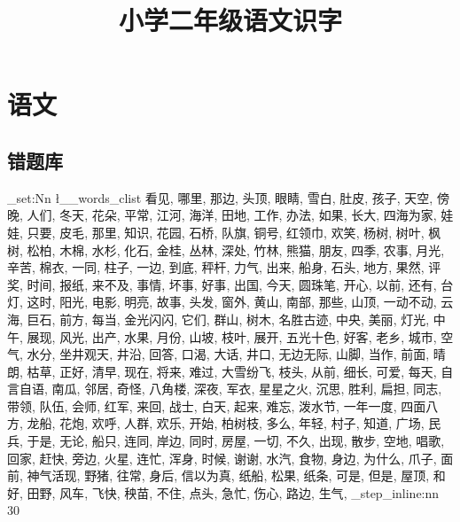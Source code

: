 \documentclass[scheme=chinese,a4paper,12pt]{ctexart}
\title{小学二年级语文识字}
\begin{document}
\maketitle
\section{语文}
\subsection{错题库}
\setlength{\parindent}{0pt}

\ExplSyntaxOn
\clist_set:Nn \l__words_clist
{
{看见},
{哪里},
{那边},
{头顶},
{眼睛},
{雪白},
{肚皮},
{孩子},
{天空},
{傍晚},
{人们},
{冬天},
{花朵},
{平常},
{江河},
{海洋},
{田地},
{工作},
{办法},
{如果},
{长大},
{四海为家},
{娃娃},
{只要},
{皮毛},
{那里},
{知识},
{花园},
{石桥},
{队旗},
{铜号},
{红领巾},
{欢笑},
{杨树},
{树叶},
{枫树},
{松柏},
{木棉},
{水杉},
{化石},
{金桂},
{丛林},
{深处},
{竹林},
{熊猫},
{朋友},
{四季},
{农事},
{月光},
{辛苦},
{棉衣},
{一同},
{柱子},
{一边},
{到底},
{秤杆},
{力气},
{出来},
{船身},
{石头},
{地方},
{果然},
{评奖},
{时间},
{报纸},
{来不及},
{事情},
{坏事},
{好事},
{出国},
{今天},
{圆珠笔},
{开心},
{以前},
{还有},
{台灯},
{这时},
{阳光},
{电影},
{明亮},
{故事},
{头发},
{窗外},
{黄山},
{南部},
{那些},
{山顶},
{一动不动},
{云海},
{巨石},
{前方},
{每当},
{金光闪闪},
{它们},
{群山},
{树木},
{名胜古迹},
{中央},
{美丽},
{灯光},
{中午},
{展现},
{风光},
{出产},
{水果},
{月份},
{山坡},
{枝叶},
{展开},
{五光十色},
{好客},
{老乡},
{城市},
{空气},
{水分},
{坐井观天},
{井沿},
{回答},
{口渴},
{大话},
{井口},
{无边无际},
{山脚},
{当作},
{前面},
{晴朗},
{枯草},
{正好},
{清早},
{现在},
{将来},
{难过},
{大雪纷飞},
{枝头},
{从前},
{细长},
{可爱},
{每天},
{自言自语},
{南瓜},
{邻居},
{奇怪},
{八角楼},
{深夜},
{军衣},
{星星之火},
{沉思},
{胜利},
{扁担},
{同志},
{带领},
{队伍},
{会师},
{红军},
{来回},
{战士},
{白天},
{起来},
{难忘},
{泼水节},
{一年一度},
{四面八方},
{龙船},
{花炮},
{欢呼},
{人群},
{欢乐},
{开始},
{柏树枝},
{多么},
{年轻},
{村子},
{知道},
{广场},
{民兵},
{于是},
{无论},
{船只},
{连同},
{岸边},
{同时},
{房屋},
{一切},
{不久},
{出现},
{散步},
{空地},
{唱歌},
{回家},
{赶快},
{旁边},
{火星},
{连忙},
{浑身},
{时候},
{谢谢},
{水汽},
{食物},
{身边},
{为什么},
{爪子},
{面前},
{神气活现},
{野猪},
{往常},
{身后},
{信以为真},
{纸船},
{松果},
{纸条},
{可是},
{但是},
{屋顶},
{和好},
{田野},
{风车},
{飞快},
{秧苗},
{不住},
{点头},
{急忙},
{伤心},
{路边},
{生气},
}
\int_step_inline:nn {30}
{
\hspace{1cm}
}
\ExplSyntaxOff
\end{document}
